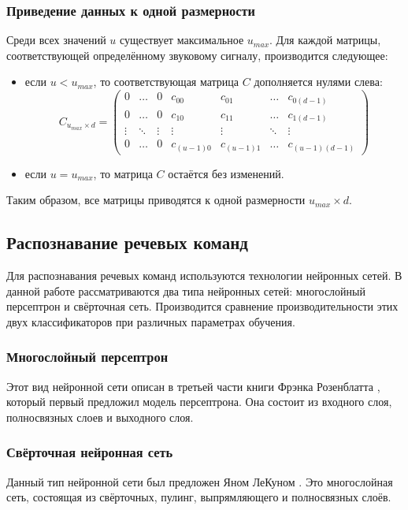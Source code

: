 \subsubsection{Приведение данных к одной размерности}
Среди всех значений $u$ существует максимальное $u_{max}$. Для каждой матрицы, соответствующей определённому звуковому сигналу, производится следующее:
\begin{itemize}[leftmargin=2cm]
	\item если $u < u_{max}$, то соответствующая матрица $C$ дополняется нулями слева:
	\begin{equation*}
		C_{u_{max} \times d} = \left(
		\begin{array}{ccccccc}
			0 & \ldots & 0 & c_{00} & c_{01} & \ldots & c_{0(d-1)}\\
			0 & \ldots & 0 & c_{10} &  c_{11} & \ldots & c_{1(d-1)}\\
			\vdots & \ddots & \vdots & \vdots & \vdots & \ddots & \vdots\\
			0 & \ldots & 0 & c_{(u-1)0} & c_{(u-1)1} & \ldots & c_{(u-1)(d-1)}
		\end{array}
		\right)
	\end{equation*}
	\item если $u = u_{max}$, то матрица $C$ остаётся без изменений.
\end{itemize}

Таким образом, все матрицы приводятся к одной размерности $u_{max} \times d$.

\subsection{Распознавание речевых команд}
Для распознавания речевых команд используются технологии нейронных сетей. В данной работе рассматриваются два типа нейронных сетей: многослойный персептрон и свёрточная сеть. Производится сравнение производительности этих двух классификаторов при различных параметрах обучения.
\subsubsection{Многослойный персептрон}
Этот вид нейронной сети описан в третьей части книги Фрэнка Розенблатта \cite{PerceptronBook}, который первый предложил модель персептрона. Она состоит из входного слоя, полносвязных слоев и выходного слоя.
\subsubsection{Свёрточная нейронная сеть}
Данный тип нейронной сети был предложен Яном ЛеКуном \cite{CNN}. Это многослойная сеть, состоящая из свёрточных, пулинг, выпрямляющего и полносвязных слоёв.

